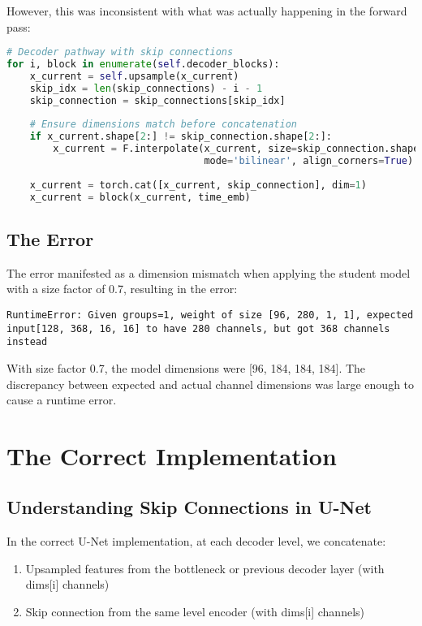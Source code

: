 \documentclass{article}
\begin{document}
However, this was inconsistent with what was actually happening in the forward pass:

\begin{lstlisting}[language=Python, frame=single]
# Decoder pathway with skip connections
for i, block in enumerate(self.decoder_blocks):
    x_current = self.upsample(x_current)
    skip_idx = len(skip_connections) - i - 1
    skip_connection = skip_connections[skip_idx]
    
    # Ensure dimensions match before concatenation
    if x_current.shape[2:] != skip_connection.shape[2:]:
        x_current = F.interpolate(x_current, size=skip_connection.shape[2:], 
                                  mode='bilinear', align_corners=True)
    
    x_current = torch.cat([x_current, skip_connection], dim=1)
    x_current = block(x_current, time_emb)
\end{lstlisting}

\subsection{The Error}

The error manifested as a dimension mismatch when applying the student model with a size factor of 0.7, resulting in the error:

\begin{lstlisting}[basicstyle=\small\ttfamily, breaklines=true, frame=single]
RuntimeError: Given groups=1, weight of size [96, 280, 1, 1], expected input[128, 368, 16, 16] to have 280 channels, but got 368 channels instead
\end{lstlisting}

With size factor 0.7, the model dimensions were [96, 184, 184, 184]. The discrepancy between expected and actual channel dimensions was large enough to cause a runtime error.

\section{The Correct Implementation}

\subsection{Understanding Skip Connections in U-Net}

In the correct U-Net implementation, at each decoder level, we concatenate:

\begin{enumerate}
  \item Upsampled features from the bottleneck or previous decoder layer (with dims[i] channels)
  \item Skip connection from the same level encoder (with dims[i] channels)
\end{enumerate}
\end{document}
